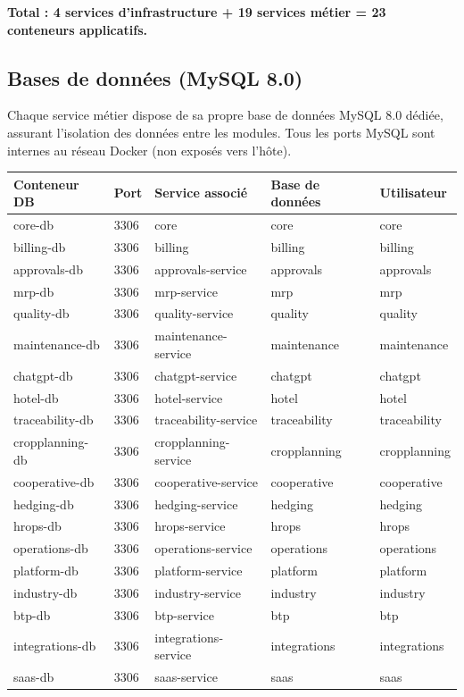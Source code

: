 \documentclass{article}
\begin{document}
\textbf{Total : 4 services d'infrastructure + 19 services métier = 23 conteneurs applicatifs.}

\subsection{Bases de données (MySQL 8.0)}

Chaque service métier dispose de sa propre base de données MySQL 8.0 dédiée, assurant l'isolation des données entre les modules. Tous les ports MySQL sont internes au réseau Docker (non exposés vers l'hôte).

\begin{longtable}{p{3.5cm}p{1.5cm}p{3.5cm}p{3cm}p{3cm}}
\toprule
\textbf{Conteneur DB} & \textbf{Port} & \textbf{Service associé} & \textbf{Base de données} & \textbf{Utilisateur} \\
\midrule
core-db & 3306 & core & core & core \\
billing-db & 3306 & billing & billing & billing \\
approvals-db & 3306 & approvals-service & approvals & approvals \\
mrp-db & 3306 & mrp-service & mrp & mrp \\
quality-db & 3306 & quality-service & quality & quality \\
maintenance-db & 3306 & maintenance-service & maintenance & maintenance \\
chatgpt-db & 3306 & chatgpt-service & chatgpt & chatgpt \\
hotel-db & 3306 & hotel-service & hotel & hotel \\
traceability-db & 3306 & traceability-service & traceability & traceability \\
cropplanning-db & 3306 & cropplanning-service & cropplanning & cropplanning \\
cooperative-db & 3306 & cooperative-service & cooperative & cooperative \\
hedging-db & 3306 & hedging-service & hedging & hedging \\
hrops-db & 3306 & hrops-service & hrops & hrops \\
operations-db & 3306 & operations-service & operations & operations \\
platform-db & 3306 & platform-service & platform & platform \\
industry-db & 3306 & industry-service & industry & industry \\
btp-db & 3306 & btp-service & btp & btp \\
integrations-db & 3306 & integrations-service & integrations & integrations \\
saas-db & 3306 & saas-service & saas & saas \\
\bottomrule
\end{longtable}
\end{document}
